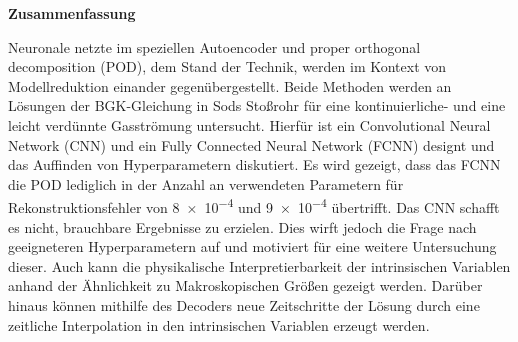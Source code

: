 {%
%
\begin{center}
{\sffamily \bfseries\Large Zusammenfassung}\\
\end{center}%
\vspace{1cm}
%
Neuronale netzte im speziellen Autoencoder und proper orthogonal decomposition (POD), dem Stand der Technik, werden im Kontext von Modellreduktion einander gegenübergestellt. Beide Methoden werden an Lösungen der BGK-Gleichung in Sods Sto\ss rohr für eine kontinuierliche- und eine leicht verdünnte Gasströmung untersucht. Hierfür ist ein Convolutional Neural Network (CNN) und ein Fully Connected Neural Network (FCNN) designt und das Auffinden von Hyperparametern diskutiert. Es wird gezeigt, dass das FCNN die POD lediglich in der Anzahl an verwendeten Parametern für Rekonstruktionsfehler von \num{8e-4} und \num{9e-4} übertrifft. Das CNN schafft es nicht, brauchbare Ergebnisse zu erzielen. Dies wirft jedoch die Frage nach geeigneteren Hyperparametern auf und motiviert für eine weitere Untersuchung dieser. Auch kann die physikalische Interpretierbarkeit der intrinsischen Variablen anhand der Ähnlichkeit zu Makroskopischen Grö\ss en gezeigt werden. Darüber hinaus können mithilfe des Decoders neue Zeitschritte der Lösung durch eine zeitliche Interpolation in den intrinsischen Variablen erzeugt werden.    

\newpage
\pagestyle{plain}
}